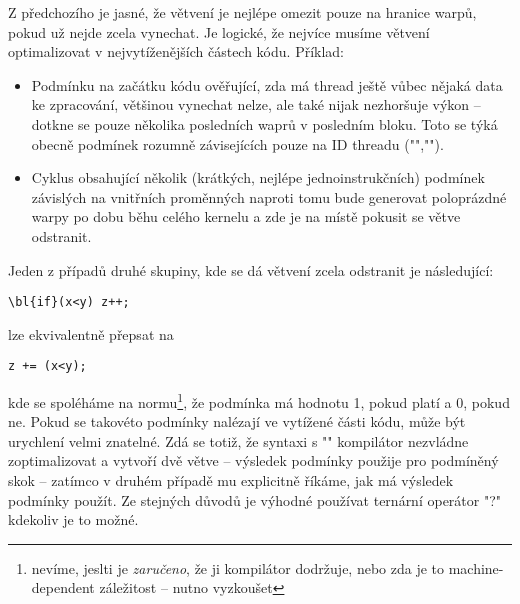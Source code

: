         Z předchozího je jasné, že větvení je nejlépe omezit pouze na hranice warpů, pokud už nejde zcela vynechat. Je logické, že nejvíce musíme větvení optimalizovat v nejvytíženějších částech kódu. Příklad:
        \begin{itemize}
        \item Podmínku na začátku kódu ověřující, zda má thread ještě vůbec nějaká data ke zpracování, většinou vynechat nelze, ale také nijak nezhoršuje výkon -- dotkne se pouze několika posledních waprů v posledním bloku. Toto se týká obecně podmínek rozumně závisejících pouze na ID threadu (\Vr"",\Vr"").
        \item Cyklus obsahující několik (krátkých, nejlépe jednoinstrukčních) podmínek závislých na vnitřních proměnných naproti tomu bude generovat poloprázdné warpy po dobu běhu celého kernelu a zde je na místě pokusit se větve odstranit.
        \end{itemize}
        Jeden z případů druhé skupiny, kde se dá větvení zcela odstranit je následující:
        \begin{Verbatim}[commandchars = \\\{\}]
\bl{if}(x<y) z++;
        \end{Verbatim}
        lze ekvivalentně přepsat na
        \begin{Verbatim}[commandchars = \\\{\}]
z += (x<y);
        \end{Verbatim}
        kde se spoléháme na normu\footnote{nevíme, jeslti je \emph{zaručeno}, že ji kompilátor dodržuje, nebo zda je to machine-dependent záležitost -- nutno vyzkoušet}, že podmínka má hodnotu 1, pokud platí a 0, pokud ne. Pokud se takovéto podmínky nalézají ve vytížené části kódu, může být urychlení velmi znatelné. Zdá se totiž, že syntaxi s \Vr"" kompilátor nezvládne zoptimalizovat a vytvoří dvě větve -- výsledek podmínky použije pro podmíněný skok -- zatímco v druhém případě mu explicitně říkáme, jak má výsledek podmínky použít. Ze stejných důvodů je výhodné používat ternární operátor \Vr"?" kdekoliv je to možné.

